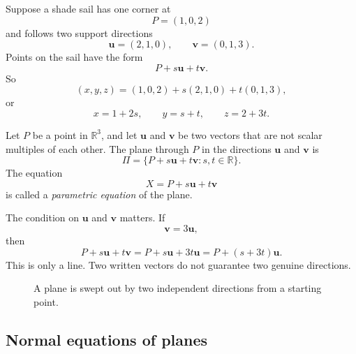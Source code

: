 Suppose a shade sail has one corner at
\[
    P=(1,0,2)
\]
and follows two support directions
\[
    \mathbf u=(2,1,0),\qquad
    \mathbf v=(0,1,3).
\]
Points on the sail have the form
\[
    P+s\mathbf u+t\mathbf v.
\]
So
\[
    (x,y,z)
    =
    (1,0,2)+s(2,1,0)+t(0,1,3),
\]
or
\[
    x=1+2s,\qquad y=s+t,\qquad z=2+3t.
\]

\begin{definition}
Let \(P\) be a point in \(\mathbb R^3\), and let \(\mathbf u\) and \(\mathbf v\) be two
vectors that are not scalar multiples of each other.  The plane through \(P\) in the
directions \(\mathbf u\) and \(\mathbf v\) is
\[
    \Pi
    =
    \{P+s\mathbf u+t\mathbf v:s,t\in\mathbb R\}.
\]
The equation
\[
    X=P+s\mathbf u+t\mathbf v
\]
is called a \emph{parametric equation} of the plane.
\end{definition}

The condition on \(\mathbf u\) and \(\mathbf v\) matters.  If
\[
    \mathbf v=3\mathbf u,
\]
then
\[
    P+s\mathbf u+t\mathbf v
    =
    P+s\mathbf u+3t\mathbf u
    =
    P+(s+3t)\mathbf u.
\]
This is only a line.  Two written vectors do not guarantee two genuine directions.

\begin{figure}[h]
\centering
{}
\caption{A plane is swept out by two independent directions from a starting point.}
\end{figure}

\subsection{Normal equations of planes}

